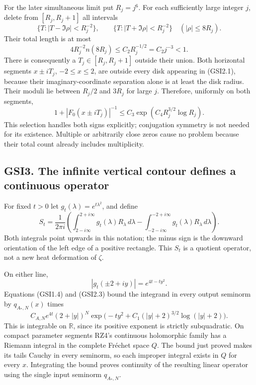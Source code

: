 For the later simultaneous limit put \(R_j=j^6\). For each sufficiently
large integer \(j\), delete from \([R_j,R_j+1]\) all intervals \[
\{T:|T-\Im\rho|<R_j^{-2}\},\qquad
\{T:|T+\Im\rho|<R_j^{-2}\}
\quad(|\rho|\le8R_j).
\tag{GSI2.4}
\] Their total length is at most \[
4R_j^{-2}n(8R_j)\le C_2R_j^{-1/2}=C_2j^{-3}<1.
\tag{GSI2.5}
\] There is consequently a \(T_j\in[R_j,R_j+1]\) outside their union.
Both horizontal segments \(x\pm iT_j\), \(-2\le x\le2\), are outside
every disk appearing in (GSI2.1), because their imaginary-coordinate
separation alone is at least the disk radius. Their moduli lie between
\(R_j/2\) and \(3R_j\) for large \(j\). Therefore, uniformly on both
segments, \[
1+|F_0(x\pm iT_j)|^{-1}
\le C_3\exp(C_4R_j^{3/2}\log R_j).
\tag{GSI2.6}
\] This selection handles both signs explicitly; conjugation symmetry is
not needed for its existence. Multiple or arbitrarily close zeros cause
no problem because their total count already includes multiplicity.

\subsection{GSI3. The infinite vertical contour defines a continuous
operator}\label{gsi3.-the-infinite-vertical-contour-defines-a-continuous-operator}

For fixed \(t>0\) let \(g_t(\lambda)=e^{t\lambda^2}\), and define \[
S_t=\frac1{2\pi i}\left(
\int_{2-i\infty}^{2+i\infty}g_t(\lambda)R_\lambda\,d\lambda
-\int_{-2-i\infty}^{-2+i\infty}g_t(\lambda)R_\lambda\,d\lambda
\right).
\tag{GSI3.1}
\] Both integrals point upwards in this notation; the minus sign is the
downward orientation of the left edge of a positive rectangle. This
\(S_t\) is a quotient operator, not a new heat deformation of \(\zeta\).

On either line, \[
|g_t(\pm2+iy)|=e^{4t-ty^2}.
\tag{GSI3.2}
\] Equations (GSI1.4) and (GSI2.3) bound the integrand in every output
seminorm by \(q_{A_*,N}(x)\) times \[
C_{A,N}e^{4t}(2+|y|)^N
\exp\bigl(-ty^2+C_1(|y|+2)^{3/2}\log(|y|+2)\bigr).
\tag{GSI3.3}
\] This is integrable on \(\mathbb R\), since its positive exponent is
strictly subquadratic. On compact parameter segments RZ4's continuous
holomorphic family has a Riemann integral in the complete Fréchet space
\(Q\). The bound just proved makes its tails Cauchy in every seminorm,
so each improper integral exists in \(Q\) for every \(x\). Integrating
the bound proves continuity of the resulting linear operator using the
single input seminorm \(q_{A_*,N}\).


